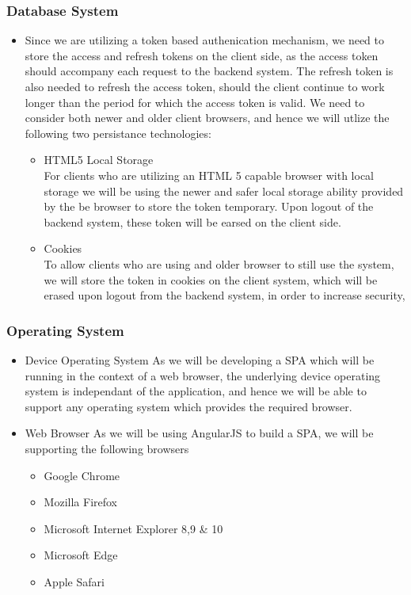 \documentclass[a4paper,10pt]{article}
\begin{document}
\subsubsection{Database System}
	\begin{itemize}
		\item Since we are utilizing a token based authenication mechanism, we need to store the access and refresh tokens on the client side, as the access token should accompany each request to the backend system.  The refresh token is also needed to refresh the access token, should the client continue to work longer than the period for which the access token is valid. We need to consider both newer and older client browsers, and hence we will utlize the following two persistance technologies:
		\begin{itemize}
			\item HTML5 Local Storage\\
				For clients who are utilizing an HTML 5 capable browser with local storage we will be using the newer and safer local storage ability provided by the be browser to store the token temporary. Upon logout of the backend system, these token will be earsed on the client side.
			\item Cookies\\
				To allow clients who are using and older browser to still use the system, we will store the token in cookies on the client system, which will be erased upon logout from the backend system, in order to increase security,
		\end{itemize}
	\end{itemize}

\subsubsection{Operating System}
	\begin{itemize}
		\item Device Operating System
			As we will be developing a SPA which will be running in the context of a web browser, the underlying device operating system is independant of the application, and hence we will be able to support any operating system which provides the required browser.
		\item Web Browser
			As we will be using AngularJS to build a SPA, we will be supporting the following browsers
		\begin{itemize}
			\item Google Chrome
			\item Mozilla Firefox
			\item Microsoft Internet Explorer 8,9 \& 10
			\item Microsoft Edge
			\item Apple Safari
		\end{itemize}
	\end{itemize}
\end{document}
